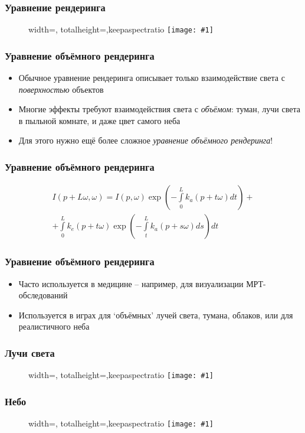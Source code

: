 \documentclass[10pt]{beamer}
\newcommand{\slideimage}[1]{
  \begin{figure}
    \begin{adjustbox}{width=\textwidth, totalheight=\textheight-2\baselineskip-2\baselineskip,keepaspectratio}
      \texttt{[image: \#1]}
    \end{adjustbox}
  \end{figure}
}
\begin{document}
\begin{frame}
\frametitle{Уравнение рендеринга}
\slideimage{bunny.png}
\end{frame}

\begin{frame}
\frametitle{Уравнение объёмного рендеринга}
\begin{itemize}
\item Обычное уравнение рендеринга описывает только взаимодействие света с \textit{поверхностью} объектов
\pause
\item Многие эффекты требуют взаимодействия света с \textit{объёмом}: туман, лучи света в пыльной комнате, и даже цвет самого неба
\pause
\item Для этого нужно ещё более сложное \textit{уравнение объёмного рендеринга}!
\end{itemize}
\end{frame}

\begin{frame}
\frametitle{Уравнение объёмного рендеринга}
\begin{gather*}
I(p+L\omega,\omega) = I(p,\omega)\exp\left(-\int\limits_0^L k_a(p+t\omega)dt\right) +\\
+ \int\limits_0^L k_e(p+t\omega) \exp\left( -\int\limits_t^L k_a(p+s\omega)ds \right)dt
\end{gather*}
\end{frame}

\begin{frame}
\frametitle{Уравнение объёмного рендеринга}
\begin{itemize}
\item Часто используется в медицине -- например, для визуализации МРТ-обследований
\pause
\item Используется в играх для `объёмных' лучей света, тумана, облаков, или для реалистичного неба
\end{itemize}
\end{frame}

\begin{frame}
\frametitle{Лучи света}
\slideimage{light-shaft.png}
\end{frame}

\begin{frame}
\frametitle{Небо}
\slideimage{sky.png}
\end{frame}
\end{document}
